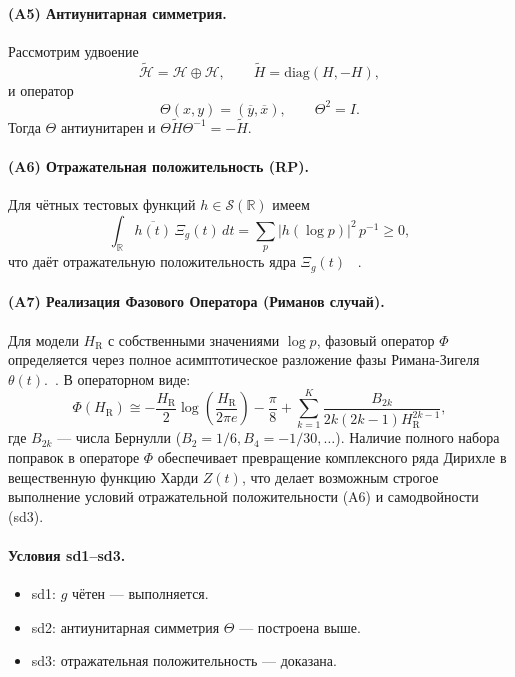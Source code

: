 \documentclass{article}
\numberwithin{equation}{section}
\theoremstyle{plain}
\theoremstyle{definition}
\theoremstyle{remark}
\def\theta{θ}\def\Theta{Θ}\def\pi{π}\def\Pi{Π}%
\begin{document}
\paragraph{(A5) Антиунитарная симметрия.}
Рассмотрим удвоение
\begin{equation}
\widetilde{\mathcal H} = \mathcal H\oplus\mathcal H,
\qquad
\widetilde H = \mathrm{diag}(H,-H),
\end{equation}
и оператор
\begin{equation}
\Theta(x,y) = (\overline{y},\overline{x}),\qquad \Theta^2=I.
\end{equation}
Тогда $\Theta$ антиунитарен и $\Theta\widetilde H\Theta^{-1}=-\widetilde H$.

\paragraph{(A6) Отражательная положительность (RP).}
Для чётных тестовых функций $h\in\mathcal S(\mathbb R)$ имеем
\begin{equation}
\int_{\mathbb R} \overline{h(t)}\,\Xi_g(t)\,dt
= \sum_p |h(\log p)|^2\,p^{-1}\ge0,
\end{equation}
что даёт отражательную положительность ядра $\Xi_g(t)$ ~\cite{Borchers1962}.

\paragraph{(A7) Реализация Фазового Оператора (Риманов случай).}
Для модели $H_{\mathrm R}$ с собственными значениями $\log p$, фазовый оператор $\Phi$ определяется через полное асимптотическое разложение фазы Римана-Зигеля $\theta(t)$.~\cite{Siegel1932, Edwards1974}.
В операторном виде:
\begin{equation}
\Phi(H_{\mathrm R}) 
\cong -\frac{H_{\mathrm R}}{2}\log\left(\frac{H_{\mathrm R}}{2\pi e}\right) - \frac{\pi}{8} + \sum_{k=1}^{K} \frac{B_{2k}}{2k(2k-1)H_{\mathrm R}^{2k-1}},
\end{equation}
где $B_{2k}$ — числа Бернулли ($B_2=1/6, B_4=-1/30, \dots$). Наличие полного набора поправок в операторе $\Phi$ обеспечивает превращение комплексного ряда Дирихле в вещественную функцию Харди $Z(t)$, что делает возможным строгое выполнение условий отражательной положительности (A6) и самодвойности (sd3).

\paragraph{Условия sd1–sd3.}
\begin{itemize}
  \item sd1: $g$ чётен — выполняется.
  \item sd2: антиунитарная симметрия $\Theta$ — построена выше.
  \item sd3: отражательная положительность — доказана.
\end{itemize}
\end{document}
